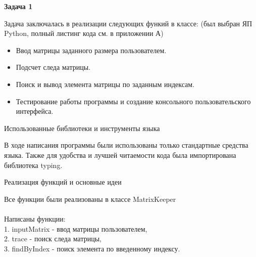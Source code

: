 \begin{Large} 
	\textbf{Задача 1}\\
	
	 \end{Large} 
Задача заключалась в реализации следующих функий в классе: (был выбран ЯП Python, полный листинг кода см. в приложении А)
\begin{itemize}
	\item Ввод матрицы заданного размера пользователем.
	\item Подсчет следа матрицы.
	\item Поиск и вывод элемента матрицы по заданным индексам.
	\item Тестирование работы программы и создание консольного пользовательского интерфейса.\\
\end{itemize}

\begin{large}
	Использованные библиотеки и инструменты языка\\
\end{large}
В ходе написания программы были использованы только стандартные средства языка. Также для удобства и лучшей читаемости кода была импортирована библиотека typing.\\

\begin{large}
	Реализация функций и основные идеи\\
\end{large}
Все функции были реализованы в классе MatrixKeeper\\\\
Написаны функции:\\
1. inputMatrix - ввод матрицы пользователем,\\
2. trace - поиск следа матрицы,\\
3. findByIndex - поиск элемента по введенному индексу.\\

